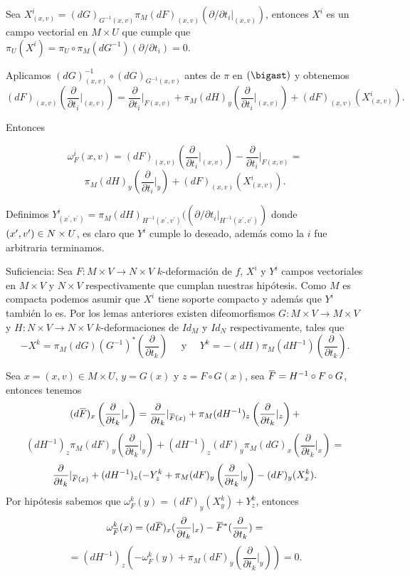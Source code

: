 \documentclass{report}
\theoremstyle{definition}
\newcommand{\overbar}[1]{\mkern 1.5mu\overline{\mkern-1.5mu#1\mkern-1.5mu}\mkern 1.5mu}
\begin{document}
Sea $X^{i}_{(x,v)} =  (dG)_{G^{-1} (x,v)} \pi_M (dF)_{(x,v)} ( \partial / \partial t_i  \vert_{(x,v)} )$, entonces $X^{i}$ es un campo vectorial en $M \times U$ que cumple que $\pi_U (X^{i}) = \pi_U \circ \pi_M (dG^{-1})( \partial / \partial t_i )= 0$.

Aplicamos $(dG)^{-1}_{(x,v)} \circ (dG)_{G^{-1} (x,v)}$ antes de $\pi$ en $(\bigast)$ y obtenemos $$(dF)_{(x,v)} \left( \frac{\partial }{\partial t_i} \vert_{(x,v)} \right) = \frac{\partial}{\partial t_i} \vert_{F(x,v)} + \pi_M (dH)_y \left( \frac{\partial}{\partial t_i} \vert_{(x,v)} \right) + (dF)_{(x,v)} (X^{i}_{(x,v)}) .$$

Entonces

$$\omega^{i}_F (x,v) = (dF)_{(x,v)} \left( \frac{\partial}{\partial t_i} \vert_{(x,v)} \right) - \frac{\partial}{\partial t_i} \vert_{F(x,v)}  =$$ $$ \pi_M (dH)_y \left( \frac{\partial}{\partial t_i } \vert_y \right)  + (dF)_{(x,v)} (X^{i}_{(x,v)}) .$$

Definimos $Y^{i}_{(x^\prime , v^\prime )} = \pi_M (dH)_{H^{-1} (x^\prime , v^\prime )} (( \partial / \partial t_i \vert_{H^{-1} (x^\prime , v^\prime )})$ donde $(x^\prime , v^\prime) \in \\ N \times U$, es claro que $Y^{i}$ cumple lo deseado, adem\'as como la $i$ fue arbitraria terminamos.

Suficiencia: Sea $F: M \times V \to N \times V$ $k$-deformaci\'on de $f$, $X^{i}$ y $Y^{i}$ campos vectoriales en $M \times V$ y $N \times V$ respectivamente que cumplan nuestras hip\'otesis. Como $M$ es compacta podemos asumir que $X^{i}$ tiene soporte compacto y adem\'as que $Y^{i}$ tambi\'en lo es. Por los lemas anteriores existen difeomorfismos $G: M \times V \to M \times V $ y $H: N \times V \to N \times V$ $k$-deformaciones de $Id_M$ y $Id_N$ respectivamente, tales que $$-X^k = \pi_M (dG) (G^{-1})^\ast \left( \frac{\partial}{\partial t_k} \right) \quad \text{  y  } \quad  Y^k= -(dH) \pi_M (dH^{-1}) \left( \frac{\partial}{\partial t_k} \right) .$$

Sea $x= (x,v) \in M \times U$, $y= G(x)$ y $z= F \circ G(x)$, sea $\overbar{F} = H^{-1} \circ F \circ G$, entonces tenemos
$$(d \overbar{F})_x \left( \frac{\partial}{\partial t_k} \vert_x \right) = \frac{\partial}{\partial t_k} \vert_{\overbar{F}(x)} + \pi_M (dH^{-1})_z \left( \frac{\partial}{\partial t_k} \vert_z \right) +$$ $$ (dH^{-1})_z \pi_M (dF)_y \left( \frac{\partial}{\partial t_k} \vert_y \right) + (dH^{-1})_z (dF)_y \pi_M (dG)_x \left( \frac{\partial}{\partial t_k} \vert_x \right) =$$ $$\frac{\partial}{\partial t_k} \vert_{\overbar{F} (x)} + (dH^{-1})_z(-Y^k_z + \pi_M (dF)_y \left( \frac{\partial }{\partial t_k} \vert_y \right) - (dF)_y(X^k_x) .$$
Por hip\'otesis sabemos que $\omega^k_F (y) =(dF)_y (X^k_y) + Y^k_z$, entonces  $$\omega_{\overbar{F}}^k (x) = (d \overbar{F})_x (\frac{\partial}{\partial t_k} \vert_x) - \overbar{F}^\ast (\frac{\partial}{\partial t_k})=$$ $$=(dH^{-1})_z (- \omega_F^k (y) + \pi_M (dF)_y (\frac{\partial}{\partial t_k} \vert_y)) = 0 .$$
\end{document}
